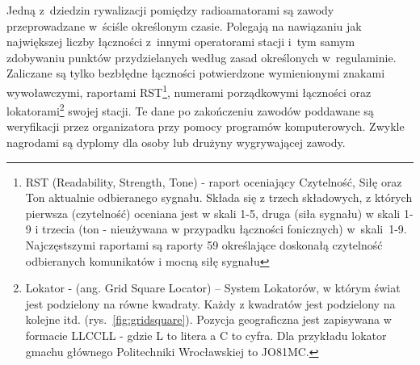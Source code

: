 \documentclass[]{mgr}
\begin{document}
                Jedną z~dziedzin rywalizacji pomiędzy radioamatorami są zawody przeprowadzane w~ściśle określonym czasie. Polegają na nawiązaniu jak największej liczby łączności z~innymi operatorami stacji i~tym samym zdobywaniu punktów przydzielanych według zasad określonych w~regulaminie. Zaliczane są tylko bezbłędne łączności potwierdzone wymienionymi znakami wywoławczymi, raportami RST\footnote{RST (Readability, Strength, Tone) - raport oceniający Czytelność, Siłę oraz Ton aktualnie odbieranego sygnału. Składa się z trzech składowych, z których pierwsza (czytelność) oceniana jest w skali 1-5, druga (siła sygnału) w skali 1-9 i trzecia (ton - nieużywana w przypadku łączności fonicznych) w~\mbox{skali~1-9}. Najczęstszymi raportami są raporty 59 określające doskonałą czytelność odbieranych komunikatów i mocną siłę sygnału}, numerami porządkowymi łączności oraz lokatorami\footnote{Lokator - (ang. Grid Square Locator) – System Lokatorów, w którym świat jest podzielony na równe kwadraty. Każdy z kwadratów jest podzielony na kolejne itd. (rys.~\ref{fig:gridsquare}). Pozycja geograficzna jest zapisywana w formacie LLCCLL - gdzie L to litera a C to cyfra. Dla przykładu lokator gmachu głównego Politechniki Wrocławskiej to JO81MC.} swojej stacji. Te dane po zakończeniu zawodów poddawane są weryfikacji przez organizatora przy pomocy programów komputerowych. Zwykle nagrodami są dyplomy dla osoby lub drużyny wygrywającej zawody.
\end{document}
